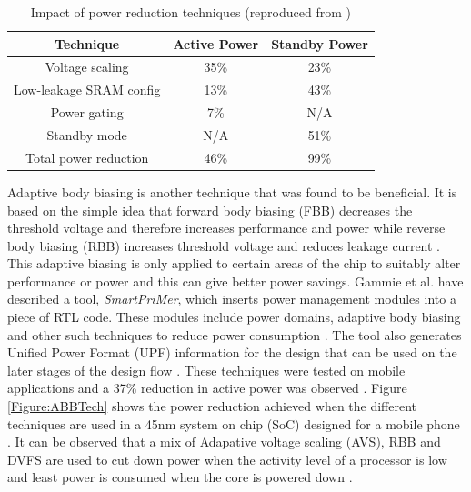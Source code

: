 \documentclass[journal]{IEEEtran}
\begin{document}
\begin{table}[ht]
\begin{center}

	\begin{tabular}{| c | c | c |}
	\hline
	Technique & Active Power & Standby Power \\ [1ex] \hline 
	Voltage scaling & 35\% & 23\% \\ [1ex] \hline
	Low-leakage SRAM config  & 13\% & 43\% \\ [1ex] \hline
	Power gating & 7\% & N/A \\ [1ex] \hline
	Standby mode & N/A & 51\% \\ [1ex] \hline
	Total power reduction & 46\% & 99\% \\ [1ex] \hline
	\end{tabular}
	\caption{Impact of power reduction techniques (reproduced from \protect\cite{FPGA})}
	\label{tab:Impact}
	
\end{center}	
\end{table}	

Adaptive body biasing is another technique that was found to be beneficial. It is based on the simple idea that forward body biasing (FBB) decreases the threshold voltage and therefore increases performance and power while reverse body biasing (RBB) increases threshold voltage and reduces leakage current \cite{ABB}. This adaptive biasing is only applied to certain areas of the chip to suitably alter performance or power and this can give better power savings. Gammie et al. \cite{ABB} have described a tool, \textit{SmartPriMer}, which inserts power management modules into a piece of RTL code. These modules include power domains, adaptive body biasing and other such techniques to reduce power consumption \cite{ABB}. The tool also generates Unified Power Format (UPF) information for the design that can be used on the later stages of the design flow \cite{ABB}. These techniques were tested on mobile applications and a 37\% reduction in active power was observed \cite{ABB}. Figure \ref{Figure:ABBTech} shows the power reduction achieved when the different techniques are used in a 45nm system on chip (SoC) designed for a mobile phone \cite{ABB}. It can be observed that a mix of Adapative voltage scaling (AVS), RBB and DVFS are used to cut down power when the activity level of a processor is low and least power is consumed when the core is powered down \cite{ABB}.
\end{document}
